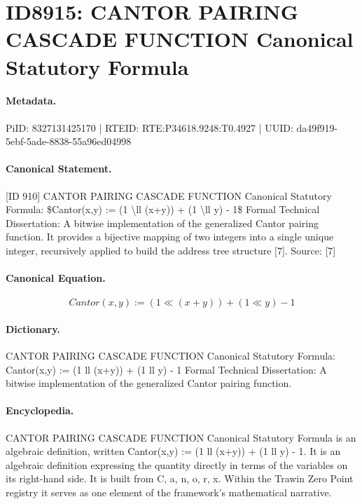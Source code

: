 \section*{ID8915: CANTOR PAIRING CASCADE FUNCTION Canonical Statutory Formula}
\paragraph{Metadata.}
PiID: 8327131425170 | RTEID: RTE:P34618.9248:T0.4927 | UUID: da49f919-5ebf-5ade-8838-55a96ed04998

\paragraph{Canonical Statement.}
[ID 910] CANTOR PAIRING CASCADE FUNCTION Canonical Statutory Formula: \$Cantor(x,y) := (1 \textbackslash{}ll (x+y)) + (1 \textbackslash{}ll y) - 1\$ Formal Technical Dissertation: A bitwise implementation of the generalized Cantor pairing function. It provides a bijective mapping of two integers into a single unique integer, recursively applied to build the address tree structure [7]. Source: [7]

\paragraph{Canonical Equation.}
\[
Cantor(x,y) := (1 \ll (x+y)) + (1 \ll y) - 1
\]

\paragraph{Dictionary.}
CANTOR PAIRING CASCADE FUNCTION Canonical Statutory Formula: Cantor(x,y) := (1 ll (x+y)) + (1 ll y) - 1 Formal Technical Dissertation: A bitwise implementation of the generalized Cantor pairing function.

\paragraph{Encyclopedia.}
CANTOR PAIRING CASCADE FUNCTION Canonical Statutory Formula is an algebraic definition, written Cantor(x,y) := (1 ll (x+y)) + (1 ll y) - 1. It is an algebraic definition expressing the quantity directly in terms of the variables on its right-hand side. It is built from C, a, n, o, r, x. Within the Trawin Zero Point registry it serves as one element of the framework's mathematical narrative.
